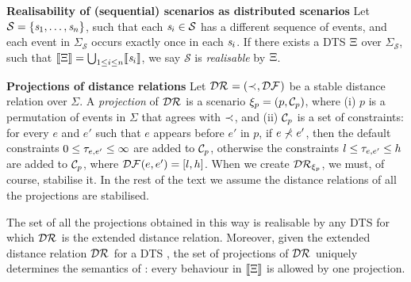 {\bf Realisability of (sequential) scenarios as distributed
scenarios}
Let $\mathcal{S}=\{\mathit{s}_1,\dots,\mathit{s}_n\}$, such that each
$\mathit{s}_i\in\mathcal{S}$ has a
different sequence of events, and
each event in $\Sigma_{\mathcal{S}}$ occurs exactly once in each $\mathit{s}_i$.
If there exists a DTS
$\Xi$ over $\Sigma_{\mathcal{S}}$, such
that $\llbracket \Xi \rrbracket = \bigcup_{1\leq i \leq
n} \llbracket \mathit{s}_{i} \rrbracket$, we say $\mathcal{S}$ is \emph{realisable} by
$\Xi$.

{\bf Projections of distance relations}
Let $\mathcal{DR}_{}=(\prec_{},\mathcal{DF}_{})$ be a
stable distance relation over $\Sigma$.
A \emph{projection} of $\mathcal{DR}_{}$ is a
scenario $\xi_p = (p, \mathcal{C}_p)$, where
(i) $p$ is a permutation of events in $\Sigma$ that
agrees with $\prec_{}$, and
(ii) $\mathcal{C}_{p}$ is a set of constraints:
for every $e$ and $e'$ such that $e$ appears before
$e'$ in $p$,
if $e\not\prec_{}e'$, then the default constraints
$0 \leq \tau_{e,e'}\leq \infty$ are added to $\mathcal{C}_p$,
otherwise the constraints
$l \leq \tau_{e,e'} \leq h$ are added to $\mathcal{C}_{p}$, where
$\mathcal{DF}_{}(e,e')=[l,h]$.
When we create $\mathcal{DR}_{\xi_p}$, we must, of course, stabilise it.
In the rest of the text we assume the distance relations of all
the projections are stabilised.

The set of all the projections obtained in this way is realisable by
any DTS for which $\mathcal{DR}_{}$ is the extended distance relation.
Moreover, given the extended distance relation $\mathcal{DR}_{}$ for a DTS
\DScenario, the set of projections of $\mathcal{DR}_{}$ uniquely determines the
semantics of \DScenario: every behaviour in $\llbracket \Xi \rrbracket$ is allowed by
one projection.
